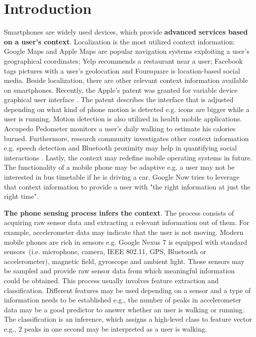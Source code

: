 \section{Introduction}
\label{s:intro}
\hspace{10pt} Smartphones are widely used devices, which provide \textbf{advanced services based on a user's context}. Localization is the most utilized context information: Google Maps \cite{google:maps} and Apple Maps \cite{apple:maps} are popular navigation systems exploiting a user's geographical coordinates; Yelp \cite{yelp:yelp} recommends a restaurant near a user; Facebook \cite{facebook:facebook} tags pictures with a user's geolocation and Foursquare \cite{foursquare:foursquare} is location-based social media. Beside localization, there are other relevant context information available on smartphones. Recently, the Apple's patent was granted for variable device graphical user interface \cite{uspatent:apple}. The patent describes the interface that is adjusted depending on what kind of phone motion is detected e.g. icons are bigger while a user is running. Motion detection is also utilized in health mobile applications. Accupedo Pedometer \cite{googleplay:accupedo} monitors a user's daily walking to estimate his calories burned. Furthermore, research community investigates other context information e.g. speech detection and Bluetooth proximity may help in quantifying social interactions \cite{rachuri:socialsense}. Lastly, the context may redefine mobile operating systems in future. The functionality of a mobile phone may be adaptive e.g. a user may not be interested in bus timetable if he is driving a car. Google Now \cite{google:googlenow} tries to leverage that context information to provide a user with "the right information at just the right time".

\textbf{The phone sensing process infers the context}. The process consists of acquiring raw sensor data and extracting a relevant information out of them. For example, accelerometer data may indicate that the user is not moving. Modern mobile phones are rich in sensors e.g. Google Nexus 7 is equipped with standard sensors\ (i.e. microphone, camera, IEEE 802.11, GPS, Bluetooth or accelerometer), magnetic field, gyroscope and ambient light. Those sensors may be sampled and provide raw sensor data from which meaningful information could be obtained. This process usually involves feature extraction and classification. Different features may be used depending on a sensor and a type of information needs to be established e.g., the number of peaks in accelerometer data may be a good predictor to answer whether an user is walking or running. The classification is an inference, which assigns a high-level class to feature vector e.g., 2 peaks in one second may be interpreted as a user is walking.

